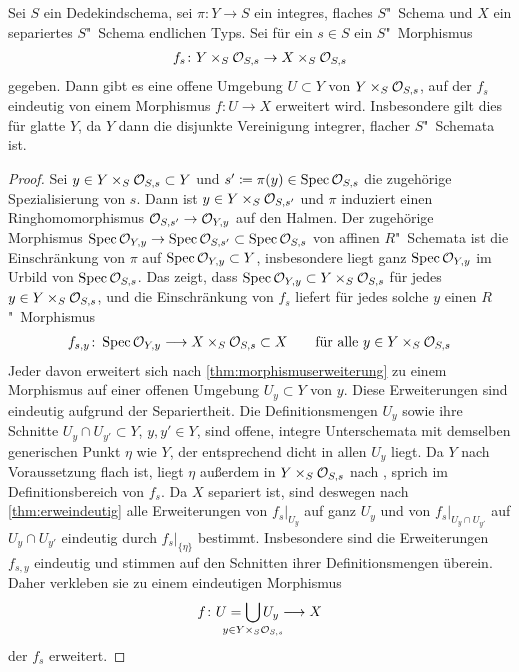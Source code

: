 \begin{Korollar}\label{thm:allgmorphismuserweiterung}
  Sei $S$ ein Dedekindschema,
  sei $\pi\colon Y\to S$ ein integres, flaches $S$"~Schema
  und $X$ ein separiertes $S$"~Schema endlichen Typs.
  Sei für ein $s\in S$ ein $S$"~Morphismus
  \begin{gather*}
    f_s\colon Y\times_S\mathcal{O}_{S,s}\to X\times_S\mathcal{O}_{S,s}
  \end{gather*}
  gegeben.
  Dann gibt es eine offene Umgebung $U\subset Y$ von
  ${Y\times_S\mathcal{O}_{S,s}}$, auf der $f_s$ eindeutig von einem Morphismus
  ${f\colon U\to X}$ erweitert wird.
  Insbesondere gilt dies für glatte $Y$, da $Y$ dann die disjunkte
  Vereinigung integrer, flacher $S$"~Schemata ist.
  \begin{proof}
    Sei $y\in Y\times_S\mathcal{O}_{S,s}\subset Y$ und
    $s'\coloneqq\pi(y)\in\operatorname{Spec}\mathcal{O}_{S,s}$ die zugehörige Spezialisierung
    von $s$. Dann ist $y\in Y\times_S\mathcal{O}_{S,s'}$ und $\pi$ induziert einen
    Ringhomomorphismus ${\mathcal{O}_{S,s'}\to\mathcal{O}_{Y,y}}$ auf den Halmen. Der
    zugehörige Morphismus
    ${\operatorname{Spec}\mathcal{O}_{Y,y}\to\operatorname{Spec}\mathcal{O}_{S,s'}\subset\operatorname{Spec}\mathcal{O}_{S,s}}$
    von affinen $R$"~Schemata ist die Einschränkung von $\pi$ auf
    ${\operatorname{Spec}\mathcal{O}_{Y,y}\subset Y}$, insbesondere  liegt ganz $\operatorname{Spec}\mathcal{O}_{Y,y}$
    im Urbild von $\operatorname{Spec}\mathcal{O}_{S,s}$.
    Das zeigt, dass ${\operatorname{Spec}\mathcal{O}_{Y,y}\subset Y\times_S\mathcal{O}_{S,s}}$ für jedes
    ${y\in Y\times_S\mathcal{O}_{S,s}}$, und die Einschränkung von $f_s$
    liefert für jedes solche $y$ einen $R$"~Morphismus
    \begin{gather*}
      f_{s,y}\colon \operatorname{Spec}\mathcal{O}_{Y,y}\longrightarrow X\times_S\mathcal{O}_{S,s}\subset X
      \qquad \text{für alle } y \in Y\times_S\mathcal{O}_{S,s}
    \end{gather*}
    Jeder davon erweitert sich nach \ref{thm:morphismuserweiterung}
    zu einem Morphismus auf einer offenen Umgebung ${U_y\subset Y}$ von
    $y$.
    Diese Erweiterungen sind eindeutig aufgrund der Separiertheit.
    Die Definitionsmengen $U_y$ sowie ihre Schnitte ${U_y\cap
    U_{y'}\subset Y}$, ${y,y'\in Y}$, sind offene, integre
    Unterschemata mit demselben generischen Punkt $\eta$ wie $Y$, der
    entsprechend dicht in allen $U_y$ liegt.
    Da $Y$ nach Voraussetzung flach ist, liegt $\eta$ außerdem in
    ${Y\times_S\mathcal{O}_{S,s}}$ nach \cite[Proposition~14.14]{wedhorn}, sprich
    im Definitionsbereich von $f_s$. Da $X$ separiert ist, sind
    deswegen nach \ref{thm:erweindeutig} alle Erweiterungen von
    $f_s|_{U_y}$ auf ganz $U_y$ und von $f_s|_{U_y\cap U_{y'}}$ auf
    ${U_y\cap U_{y'}}$ eindeutig durch $f_s|_{\{\eta\}}$ bestimmt.
    Insbesondere sind die Erweiterungen $f_{s,y}$ eindeutig und
    stimmen auf den Schnitten ihrer Definitionsmengen überein.
    Daher verkleben sie zu einem eindeutigen Morphismus
    \begin{gather*}
      f\colon U=\bigcup_{\mathclap{y\in Y\times_S\O_{S,s}}} U_y\longto X
    \end{gather*}
    der $f_s$ erweitert.
  \end{proof}
\end{Korollar}
